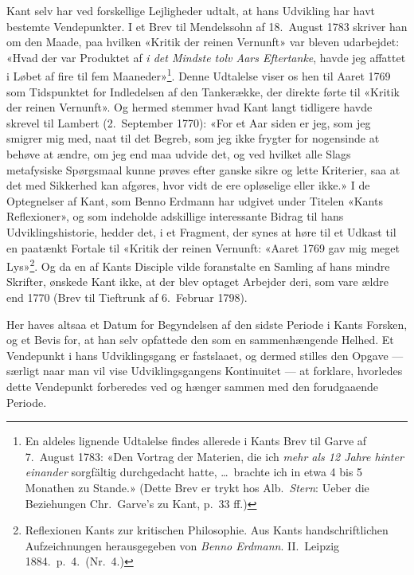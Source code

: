 \documentclass[12pt,a4paper]{article}
\begin{document}
Kant selv har ved forskellige Lejligheder udtalt, at hans Udvikling har
havt bestemte Vendepunkter. I et Brev til Mendelssohn af 18.\ August
1783 skriver han om den Maade, paa hvilken «Kritik der reinen Vernunft»
var bleven udarbejdet: «Hvad der var Produktet af \emph{i det Mindste tolv
Aars Eftertanke}, havde jeg affattet i Løbet af fire til fem
Maaneder»\footnote{En aldeles lignende Udtalelse findes allerede i Kants
Brev til Garve af 7.\ August 1783: «Den Vortrag der Materien, die ich
\emph{mehr als 12 Jahre hinter einander} sorgfältig durchgedacht hatte, \ldots\
brachte ich in etwa 4 bis 5 Monathen zu Stande.» (Dette Brev er trykt
hos Alb.\ \emph{Stern}: Ueber die Beziehungen Chr.\ Garve's zu Kant,
p.\ 33 ff.)}. Denne Udtalelse viser os hen til Aaret 1769 som Tidspunktet
for Indledelsen af den Tankerække, der direkte førte til «Kritik der
reinen Vernunft». Og hermed stemmer hvad Kant langt tidligere havde
skrevel til Lambert (2.\ September 1770): «For et Aar siden er jeg, som
jeg smigrer mig med, naat til det Begreb, som jeg ikke frygter for
nogensinde at behøve at ændre, om jeg end maa udvide det, og ved hvilket
alle Slags metafysiske Spørgsmaal kunne prøves efter ganske sikre og
lette Kriterier, saa at det med Sikkerhed kan afgøres, hvor vidt de ere
opløselige eller ikke.» I de Optegnelser af Kant, som Benno Erdmann har
udgivet under Titelen «Kants Reflexioner», og som indeholde adskillige
interessante Bidrag til hans Udviklingshistorie, hedder det, i et
Fragment, der synes at høre til et Udkast til en paatænkt Fortale til
«Kritik der reinen Vernunft: «Aaret 1769 gav mig meget
Lys»\footnote{Reflexionen Kants zur kritischen Philosophie. Aus
Kants handschriftlichen Aufzeichnungen herausgegeben von \emph{Benno Erdmann}.
II.\ Leipzig 1884.\ p.\ 4.\ (Nr.\ 4.)}. Og da en af Kants Disciple vilde
foranstalte en Samling af hans mindre Skrifter, ønskede Kant ikke, at
der blev optaget Arbejder deri, som vare ældre end 1770 (Brev til
Tieftrunk af 6.\ Februar 1798).

Her haves altsaa et Datum for Begyndelsen af den sidste Periode i Kants
Forsken, og et Bevis for, at han selv opfattede den som en sammenhængende
Helhed. Et Vendepunkt i hans Udviklingsgang er fastslaaet, og dermed
stilles den Opgave --- særligt naar man vil vise Udviklingsgangens
Kontinuitet --- at forklare, hvorledes dette Vendepunkt forberedes ved
og hænger sammen med den forudgaaende Periode.
\end{document}
